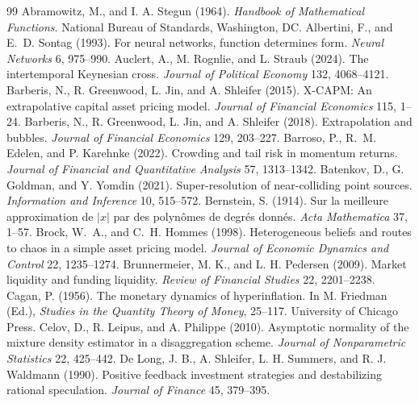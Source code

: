 \documentclass[12pt]{article}
\theoremstyle{definition}
\theoremstyle{remark}
\begin{document}
\begin{thebibliography}{99}\setlength{\itemsep}{2pt}\small
{} Abramowitz, M., and I. A. Stegun (1964). \emph{Handbook of Mathematical Functions}. National Bureau of Standards, Washington, DC.
 Albertini, F., and E.~D. Sontag (1993). For neural networks, function determines form. \emph{Neural Networks} 6, 975--990.
 Auclert, A., M. Rognlie, and L. Straub (2024). The intertemporal Keynesian cross. \emph{Journal of Political Economy} 132, 4068--4121.
 Barberis, N., R. Greenwood, L. Jin, and A. Shleifer (2015). X-CAPM: An extrapolative capital asset pricing model. \emph{Journal of Financial Economics} 115, 1--24.
 Barberis, N., R. Greenwood, L. Jin, and A. Shleifer (2018). Extrapolation and bubbles. \emph{Journal of Financial Economics} 129, 203--227.
 Barroso, P., R.~M. Edelen, and P. Karehnke (2022). Crowding and tail risk in momentum returns. \emph{Journal of Financial and Quantitative Analysis} 57, 1313--1342.
 Batenkov, D., G. Goldman, and Y. Yomdin (2021). Super-resolution of near-colliding point sources. \emph{Information and Inference} 10, 515--572.
 Bernstein, S. (1914). Sur la meilleure approximation de $|x|$ par des polyn\^omes de degr\'es donn\'es. \emph{Acta Mathematica} 37, 1--57.
 Brock, W.~A., and C.~H. Hommes (1998). Heterogeneous beliefs and routes to chaos in a simple asset pricing model. \emph{Journal of Economic Dynamics and Control} 22, 1235--1274.
 Brunnermeier, M. K., and L. H. Pedersen (2009). Market liquidity and funding liquidity. \emph{Review of Financial Studies} 22, 2201--2238.
 Cagan, P. (1956). The monetary dynamics of hyperinflation. In M. Friedman (Ed.), \emph{Studies in the Quantity Theory of Money}, 25--117. University of Chicago Press.
 Celov, D., R. Leipus, and A. Philippe (2010). Asymptotic normality of the mixture density estimator in a disaggregation scheme. \emph{Journal of Nonparametric Statistics} 22, 425--442.
 De Long, J. B., A. Shleifer, L. H. Summers, and R. J. Waldmann (1990). Positive feedback investment strategies and destabilizing rational speculation. \emph{Journal of Finance} 45, 379--395.

\end{thebibliography}
\end{document}
